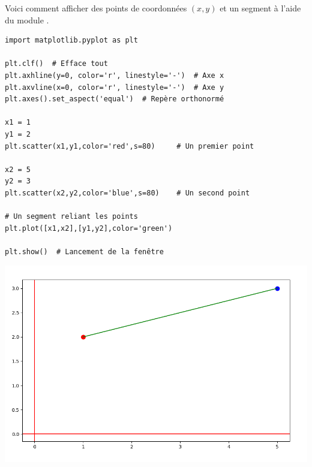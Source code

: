\documentclass[11pt,class=report,crop=false]{standalone}
\begin{document}

\begin{cours}


Voici comment afficher des points de coordonnées $(x,y)$ et un segment à l'aide du module .

\begin{center}
\begin{minipage}{0.75\textwidth}
\begin{lstlisting}
import matplotlib.pyplot as plt

plt.clf()  # Efface tout
plt.axhline(y=0, color='r', linestyle='-')  # Axe x
plt.axvline(x=0, color='r', linestyle='-')  # Axe y
plt.axes().set_aspect('equal')  # Repère orthonormé

x1 = 1
y1 = 2
plt.scatter(x1,y1,color='red',s=80)     # Un premier point

x2 = 5
y2 = 3
plt.scatter(x2,y2,color='blue',s=80)    # Un second point

# Un segment reliant les points
plt.plot([x1,x2],[y1,y2],color='green')  

plt.show()  # Lancement de la fenêtre
\end{lstlisting} 
\end{minipage}
\end{center}

\begin{center}
\includegraphics[scale=\myscale,scale=0.4]{ecran-complexes1-cours}
\end{center}	 

\end{cours}
\end{document}

